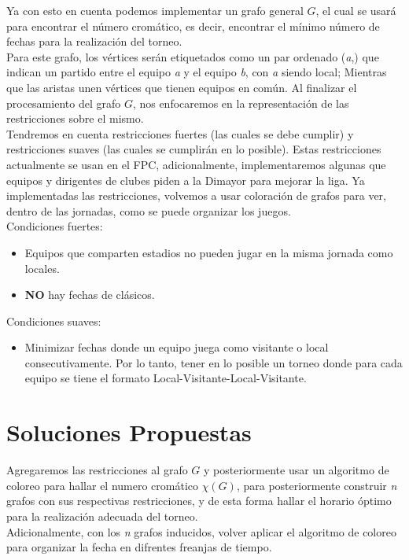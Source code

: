 \documentclass[11pt]{article}
\begin{document}
\begin{multicols}{2}
            Ya con esto en cuenta podemos implementar un grafo general $G$, el cual se usará para 
            encontrar el número cromático, es decir, encontrar el mínimo número de fechas para la 
            realización del torneo.\\
            Para este grafo, los vértices serán etiquetados como un par ordenado (\textit{a},) que indican un 
            partido entre el equipo \textit{a} y el equipo \textit{b}, con \textit{a} siendo local; Mientras que las aristas unen 
            vértices que tienen equipos en común. Al finalizar el procesamiento del grafo $G$, nos enfocaremos en la representación de las restricciones
            sobre el mismo.\\[10pt]
            Tendremos en cuenta restricciones fuertes (las cuales se debe cumplir) y restricciones 
            suaves (las cuales se cumplirán en lo posible). Estas restricciones 
            actualmente se usan en el FPC, adicionalmente, implementaremos algunas que equipos y 
            dirigentes de clubes piden a la Dimayor para mejorar la liga. Ya implementadas las 
            restricciones, volvemos a usar coloración de grafos para ver, dentro de las jornadas, como 
            se puede organizar los juegos.\\[10pt]
            Condiciones fuertes:
            \begin{itemize}
                \item Equipos que comparten estadios no pueden jugar en la misma jornada como locales.
                \item \textbf{NO} hay fechas de clásicos.
            \end{itemize}
            Condiciones suaves:
            \begin{itemize}  
                \item Minimizar fechas donde un equipo juega como visitante o local consecutivamente. 
                Por lo tanto, tener en lo posible un torneo donde para cada equipo se tiene 
                el formato Local-Visitante-Local-Visitante.     
            \end{itemize}

        \section{Soluciones Propuestas}
            
            Agregaremos las restricciones al grafo $G$ y posteriormente usar un algoritmo de coloreo para hallar el numero cromático $\chi(G)$, para 
            posteriormente construir \textit{n} grafos con sus respectivas restricciones, y de esta forma 
            hallar el horario óptimo para la realización adecuada del torneo.\\
            Adicionalmente, con los \textit{n} grafos inducidos, volver aplicar el algoritmo de coloreo para organizar la fecha en difrentes
            freanjas de tiempo.
            
        
        

    \end{multicols}
\end{document}
